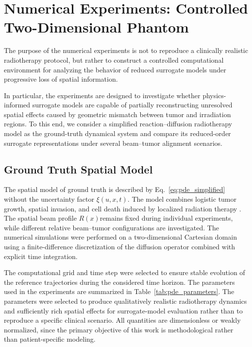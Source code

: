 
\section{Numerical Experiments: Controlled Two-Dimensional Phantom}
\label{sec:experiments}
The purpose of the numerical experiments is not to reproduce a
clinically realistic radiotherapy protocol, but rather to construct a
controlled computational environment for analyzing the behavior of
reduced surrogate models under progressive loss of spatial information.

In particular, the experiments are designed to investigate whether
physics-informed surrogate models are capable of partially
reconstructing unresolved spatial effects caused by geometric mismatch
between tumor and irradiation regions. To this end, we consider a
simplified reaction--diffusion radiotherapy model as the ground-truth
dynamical system and compare its reduced-order surrogate representations
under several beam--tumor alignment scenarios.

\subsection{Ground Truth Spatial Model}

The spatial model of ground truth is described by Eq.~\eqref{eq:pde_simplified} without the
uncertainty factor \(\xi(u,x,t).\) The model combines logistic tumor
growth, spatial invasion, and cell death induced by localized radiation therapy
. The spatial beam profile \(R(x)\)remains fixed during
individual experiments, while different relative beam--tumor
configurations are investigated. The numerical simulations were
performed on a two-dimensional Cartesian domain using a
finite-difference discretization of the diffusion operator combined with
explicit time integration.

The computational grid and time step were
selected to ensure stable evolution of the reference trajectories during
the considered time horizon. The parameters used in the experiments are
summarized in Table~\ref{tab:pde_parameters}. The parameters were selected to produce qualitatively realistic
radiotherapy dynamics and sufficiently rich spatial effects for
surrogate-model evaluation rather than to reproduce a specific clinical
scenario. All quantities are dimensionless or weakly normalized, since
the primary objective of this work is methodological rather than
patient-specific modeling.

